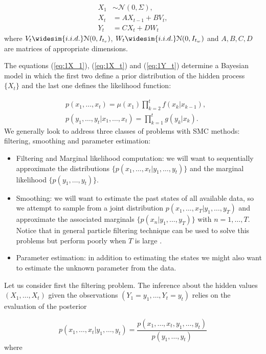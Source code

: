 \begin{align*}
    X_1 &\sim \mathcal{N}(0, \Sigma),\\
    X_t & = A X_{t-1} + B V_t, \\
    Y_t & = C X_t + D W_t
\end{align*}
where $V_t \widesim{i.i.d.} \mathcal{N}(0, I_{t_v})$, $W_t \widesim{i.i.d.} \mathcal{N}(0, I_{t_w})$ and $A, B, C, D$ are matrices of appropriate dimensions. 

The equations (\ref{eq:1X_1}), (\ref{eq:1X_t}) and (\ref{eq:1Y_t}) determine a Bayesian model in which the first two define a prior distribution of the hidden process $\{ X_t \}$ and the last one defines the likelihood function:

\begin{align*}
    & p(x_1, \dots, x_t) = \mu(x_1) \prod_{k=2}^t f(x_k | x_{k-1}), \\
    & p(y_1, \dots, y_t | x_1, \dots, x_t) = \prod_{k=1}^t g(y_k | x_k).
\end{align*}
We generally look to address three classes of problems with SMC methods: filtering, smoothing and parameter estimation:

\begin{itemize}
    \item Filtering and Marginal likelihood computation: we will want to sequentially approximate the distributions $\{ p(x_1, \dots, x_t | y_1, \dots, y_t) \}$ and the marginal likelihood $\{ p(y_1, \dots, y_t) \}$.
    \item Smoothing: we will want to estimate the past states of all available data, so we attempt to sample from a joint distribution $p(x_1, \dots, x_T | y_1, \dots, y_T)$ and approximate the associated marginals $\{ p(x_n | y_1, \dots, y_T)\}$ with $n = 1, \dots, T$. Notice that in general particle filtering technique can be used to solve this problems but perform poorly when $T$ is large \cite{DoucetTutorial}.
    \item Parameter estimation: in addition to estimating the states we might also want to estimate the unknown parameter from the data.
\end{itemize}

Let us consider first the filtering problem. The inference about the hidden values $(X_1, \dots, X_t)$ given the observations $(Y_1 = y_1, \dots, Y_t = y_t)$ relies on the evaluation of the posterior

\begin{equation*}
    p(x_1, \dots, x_t | y_1, \dots, y_t) = \frac{p(x_1, \dots, x_t, y_1, \dots, y_t)}{p(y_1, \dots, y_t)}
\end{equation*}
where

